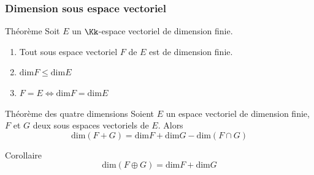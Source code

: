 \documentclass[dvipsnames]{beamer}
\begin{document}
\begin{frame}[t]
  \frametitle{Dimension sous espace vectoriel}
  \begin{block}{Théorème}
    \small
    Soit $E$ un $\Kk$-espace vectoriel de dimension finie.

    \begin{enumerate}
      \item  Tout sous espace vectoriel $F$ de $E$ est de dimension
        finie.\\[4pt]
      \item $\text{dim} F \leq \text{dim} E$\\[4pt]
      \item $F=E \iff \text{dim}F = \text{dim} E$
    \end{enumerate}
  \end{block}
  \pause
  \begin{block}{Théorème des quatre dimensions}
    \small
    Soient $E$ un espace vectoriel de dimension finie, $F$ et $G$ deux
    sous espaces vectoriels de $E$. Alors
    \begin{equation}
      \text{dim}(F + G) = \text{dim}F + \text{dim}G -
      \text{dim}(F\cap G)
    \end{equation}
    \begin{block}{Corollaire}
      \begin{equation*}
        \text{dim}(F\oplus G) = \text{dim}F + \text{dim}G
      \end{equation*}
    \end{block}
  \end{block}
\end{frame}
\end{document}
